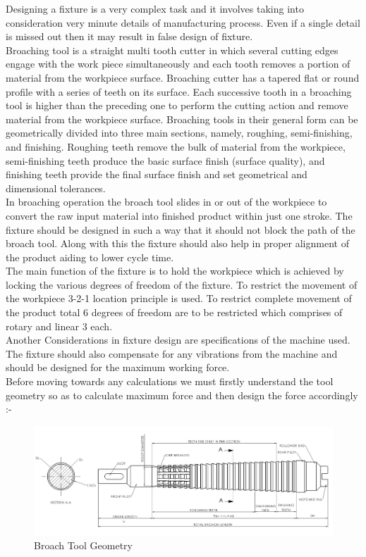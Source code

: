 \documentclass[16pt,a4paper]{article}
\begin{document}
Designing a fixture is a very complex task and it involves taking into consideration very minute details of manufacturing process. Even if a single detail is missed out then it may result in false design of fixture.
\\Broaching tool is a straight multi tooth cutter in which several cutting edges engage with the work piece simultaneously and each tooth removes a portion of material from the workpiece surface. Broaching cutter has a tapered ﬂat or round proﬁle with a series of teeth on its surface. Each successive tooth in a broaching tool is higher than the preceding one to perform the cutting action and remove material from the workpiece surface. Broaching tools in their general form can be geometrically divided into three main sections, namely, roughing, semi-ﬁnishing, and ﬁnishing. Roughing teeth remove the bulk of material from the workpiece, semi-ﬁnishing teeth produce the basic surface ﬁnish (surface quality), and ﬁnishing teeth provide the ﬁnal surface ﬁnish and set geometrical and dimensional tolerances.
\\In broaching operation the broach tool slides in or out of the workpiece to convert the raw input material into finished product within just one stroke. The fixture should be designed in such a way that it should not block the path of the broach tool. Along with this the fixture should also help in proper alignment of the product aiding to lower cycle time.
\\The main function of the fixture is to hold the workpiece which is achieved by locking the various degrees of freedom of the fixture. To restrict the movement of the workpiece 3-2-1 location principle is used. To restrict complete movement of the product total 6 degrees of freedom are to be restricted which comprises of  rotary and linear 3 each.
\\Another Considerations in fixture design are specifications of the machine used. The fixture should also compensate for any  vibrations from the machine and should be designed for the maximum working force.\\    

Before moving towards any calculations we must firstly understand the tool geometry so as to calculate maximum force and then design the force accordingly :-

\begin{figure}[h]
\centering
\includegraphics[scale=0.3]{Broach Tool Geometry}
\caption{Broach Tool Geometry}
\label{fig:Broach Tool Geometry}
\end{figure}
\end{document}
